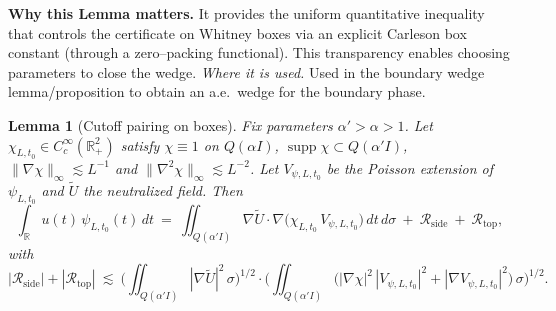 \documentclass[11pt]{article}
\newtheorem{lemma}{Lemma}[section]
\theoremstyle{definition}
\theoremstyle{remark}
\newcommand{\R}{\mathbb{R}}
\begin{document}
\vspace{1.0cm}
\noindent\textbf{Why this Lemma matters.} It provides the uniform quantitative inequality that controls the certificate on Whitney boxes via an explicit Carleson box constant (through a zero--packing functional). This transparency enables choosing parameters to close the wedge.
\noindent\textit{Where it is used.} Used in the boundary wedge lemma/proposition to obtain an a.e.\ wedge for the boundary phase.
\begin{lemma}[Cutoff pairing on boxes]
\label{lem:cutoff-pairing}
Fix parameters $\alpha'>\alpha>1$. Let $\chi_{L,t_0}\in C_c^\infty(\R^2_+)$ satisfy $\chi\equiv1$ on $Q(\alpha I)$, $\operatorname{supp}\chi\subset Q(\alpha'I)$, $\|\nabla\chi\|_\infty\lesssim L^{-1}$ and $\|\nabla^2\chi\|_\infty\lesssim L^{-2}$. Let $V_{\psi,L,t_0}$ be the Poisson extension of $\psi_{L,t_0}$ and $\widetilde U$ the neutralized field. Then
\[
 \int_{\R} u(t)\,\psi_{L,t_0}(t)\,dt
 \ =\ \iint_{Q(\alpha'I)} \nabla \widetilde U\cdot \nabla\big(\chi_{L,t_0}\, V_{\psi,L,t_0}\big)\,dt\,d\sigma\ +\ \mathcal R_{\mathrm{side}}\ +\ \mathcal R_{\mathrm{top}},
\]
with
\[
 |\mathcal R_{\mathrm{side}}|+|\mathcal R_{\mathrm{top}}|
 \ \lesssim\ \Big(\iint_{Q(\alpha'I)} |\nabla \widetilde U|^2\,\sigma\Big)^{1/2}
               \cdot \Big(\iint_{Q(\alpha'I)} \big(|\nabla\chi|^2\,|V_{\psi,L,t_0}|^2+|\nabla V_{\psi,L,t_0}|^2\big)\,\sigma\Big)^{1/2}.
\]
\end{lemma}
\end{document}
